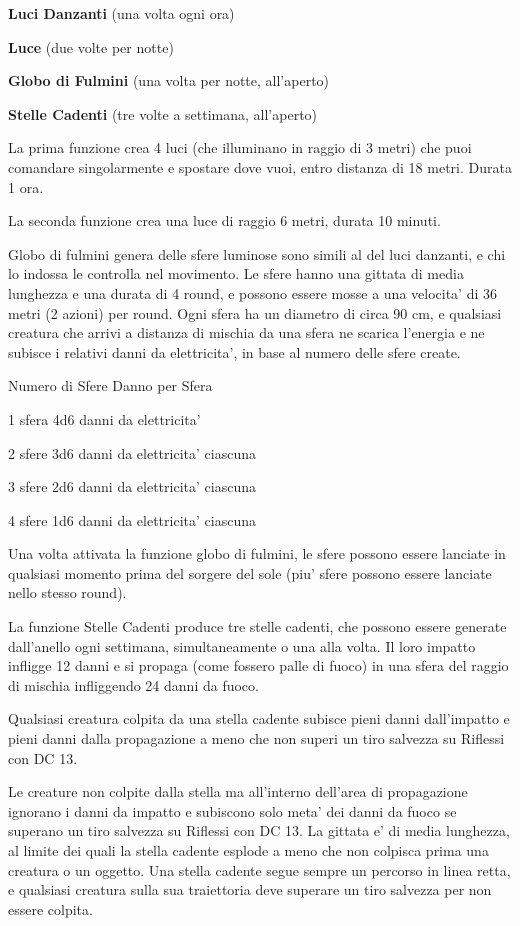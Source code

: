 \documentclass[a4paper,11pt,twoside,openany]{book}
\begin{document}
{		\textbf{Luci Danzanti} (una volta ogni ora)
		
		\textbf{Luce} (due volte per notte)
		
		\textbf{Globo di Fulmini} (una volta per notte, all'aperto)
		
		\textbf{Stelle Cadenti} (tre volte a settimana, all'aperto)
		
		La prima funzione crea 4 luci (che illuminano in raggio di 3 metri) che puoi comandare singolarmente e spostare dove vuoi, entro distanza di 18 metri. Durata 1 ora.
		
		La seconda funzione crea una luce di raggio 6 metri, durata 10 minuti.
		
		Globo di fulmini genera delle sfere luminose sono simili al del luci danzanti, e chi lo indossa le controlla nel movimento. Le sfere hanno una gittata di media lunghezza e una durata di 4 round, e possono essere mosse a una velocita' di 36 metri (2 azioni) per round. Ogni sfera ha un diametro di circa 90 cm, e qualsiasi creatura che arrivi a distanza di mischia da una sfera ne scarica l'energia e ne subisce i relativi danni da elettricita', in base al numero delle sfere create.
		
		Numero di Sfere Danno per Sfera
		
		1 sfera 4d6 danni da elettricita'
		
		2 sfere 3d6 danni da elettricita' ciascuna
		
		3 sfere 2d6 danni da elettricita' ciascuna
		
		4 sfere 1d6 danni da elettricita' ciascuna
		
		Una volta attivata la funzione globo di fulmini, le sfere possono essere lanciate in qualsiasi momento prima del sorgere del sole (piu' sfere possono essere lanciate nello stesso round).
		
		La funzione Stelle Cadenti produce tre stelle cadenti, che possono essere generate dall'anello ogni settimana, simultaneamente o una alla volta. Il loro impatto infligge 12 danni e si propaga (come fossero palle di fuoco) in una sfera del raggio di mischia infliggendo 24 danni da fuoco.
		
		Qualsiasi creatura colpita da una stella cadente subisce pieni danni dall'impatto e pieni danni dalla propagazione a meno che non superi un tiro salvezza su Riflessi con DC 13.
		
		Le creature non colpite dalla stella ma all'interno dell'area di propagazione ignorano i danni da impatto e subiscono solo meta' dei danni da fuoco se superano un tiro salvezza su Riflessi con DC 13. La gittata e' di media lunghezza, al limite dei quali la stella cadente esplode a meno che non colpisca prima una creatura o un oggetto. Una stella cadente segue sempre un percorso in linea retta, e qualsiasi creatura sulla sua traiettoria deve superare un tiro salvezza per non essere colpita. 
		
}
\end{document}
